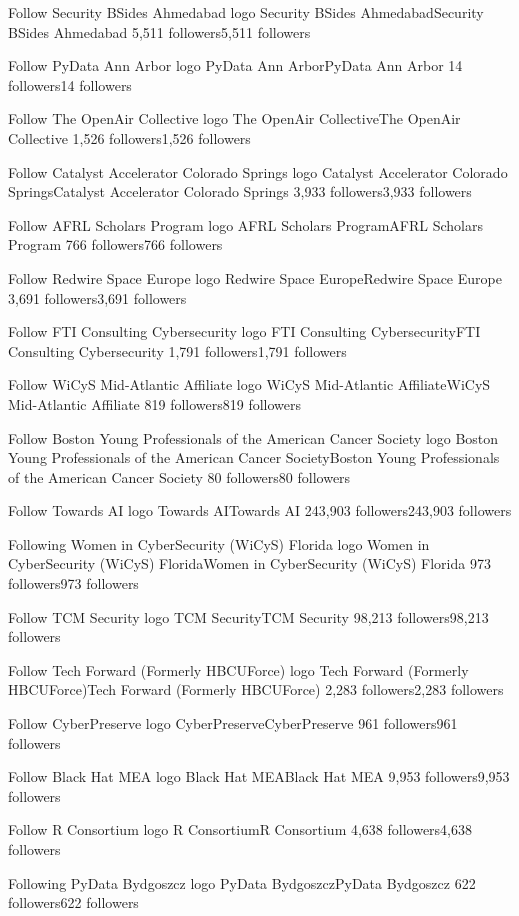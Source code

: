 Follow
Security BSides Ahmedabad logo
Security BSides AhmedabadSecurity BSides Ahmedabad
5,511 followers5,511 followers

Follow
PyData Ann Arbor logo
PyData Ann ArborPyData Ann Arbor
14 followers14 followers

Follow
The OpenAir Collective logo
The OpenAir CollectiveThe OpenAir Collective
1,526 followers1,526 followers

Follow
Catalyst Accelerator Colorado Springs logo
Catalyst Accelerator Colorado SpringsCatalyst Accelerator Colorado Springs
3,933 followers3,933 followers

Follow
AFRL Scholars Program logo
AFRL Scholars ProgramAFRL Scholars Program
766 followers766 followers

Follow
Redwire Space Europe logo
Redwire Space EuropeRedwire Space Europe
3,691 followers3,691 followers

Follow
FTI Consulting Cybersecurity logo
FTI Consulting CybersecurityFTI Consulting Cybersecurity
1,791 followers1,791 followers

Follow
WiCyS Mid-Atlantic Affiliate logo
WiCyS Mid-Atlantic AffiliateWiCyS Mid-Atlantic Affiliate
819 followers819 followers

Follow
Boston Young Professionals of the American Cancer Society logo
Boston Young Professionals of the American Cancer SocietyBoston Young Professionals of the American Cancer Society
80 followers80 followers

Follow
Towards AI logo
Towards AITowards AI
243,903 followers243,903 followers

Following
Women in CyberSecurity (WiCyS) Florida logo
Women in CyberSecurity (WiCyS) FloridaWomen in CyberSecurity (WiCyS) Florida
973 followers973 followers

Follow
TCM Security logo
TCM SecurityTCM Security
98,213 followers98,213 followers

Follow
Tech Forward (Formerly HBCUForce) logo
Tech Forward (Formerly HBCUForce)Tech Forward (Formerly HBCUForce)
2,283 followers2,283 followers

Follow
CyberPreserve logo
CyberPreserveCyberPreserve
961 followers961 followers

Follow
Black Hat MEA logo
Black Hat MEABlack Hat MEA
9,953 followers9,953 followers

Follow
R Consortium logo
R ConsortiumR Consortium
4,638 followers4,638 followers

Following
PyData Bydgoszcz logo
PyData BydgoszczPyData Bydgoszcz
622 followers622 followers

